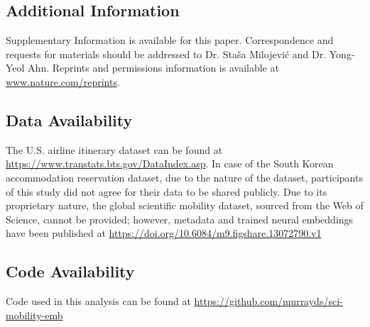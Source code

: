 \documentclass[12pt]{article} %
\begin{document}
%
% 
\subsection*{Additional Information}
Supplementary Information is available for this paper.
Correspondence and requests for materials should be addressed to Dr. Staša Milojević and Dr. Yong-Yeol Ahn.
Reprints and permissions information is available at 
\url{www.nature.com/reprints}.


\subsection*{Data Availability}
The U.S. airline itinerary dataset can be found at \url{https://www.transtats.bts.gov/DataIndex.asp}. 
In case of the South Korean accommodation reservation dataset, due to the nature of the dataset, participants of this study did not agree for their data to be shared publicly.
Due to its proprietary nature, the global scientific mobility dataset, sourced from the Web of Science, cannot be provided;
however, metadata and trained neural embeddings have been published at \url{https://doi.org/10.6084/m9.figshare.13072790.v1}

\subsection*{Code Availability}
Code used in this analysis can be found at \url{https://github.com/murrayds/sci-mobility-emb}


\printbibliography{}
\end{document}
